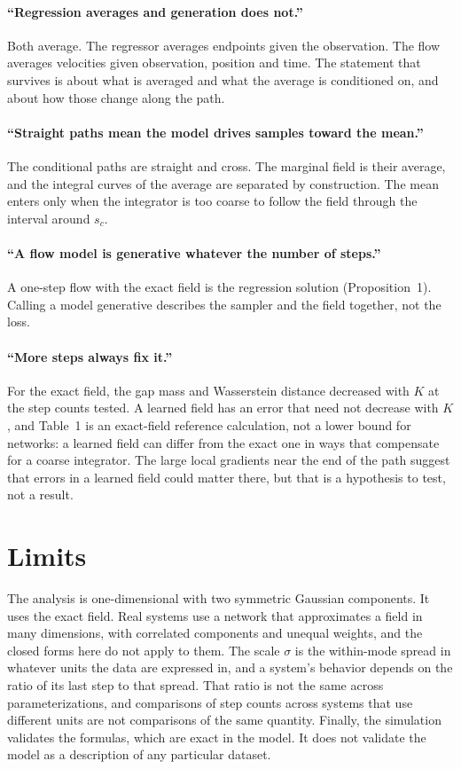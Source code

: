 \documentclass[11pt]{article}
\theoremstyle{definition}
\begin{document}
\paragraph{``Regression averages and generation does not.''} Both average. The regressor averages endpoints given the observation. The flow averages velocities given observation, position and time. The statement that survives is about what is averaged and what the average is conditioned on, and about how those change along the path.

\paragraph{``Straight paths mean the model drives samples toward the mean.''} The conditional paths are straight and cross. The marginal field is their average, and the integral curves of the average are separated by construction. The mean enters only when the integrator is too coarse to follow the field through the interval around $s_c$.

\paragraph{``A flow model is generative whatever the number of steps.''} A one-step flow with the exact field is the regression solution (Proposition~1). Calling a model generative describes the sampler and the field together, not the loss.

\paragraph{``More steps always fix it.''} For the exact field, the gap mass and Wasserstein distance decreased with $K$ at the step counts tested. A learned field has an error that need not decrease with $K$, and Table~1 is an exact-field reference calculation, not a lower bound for networks: a learned field can differ from the exact one in ways that compensate for a coarse integrator. The large local gradients near the end of the path suggest that errors in a learned field could matter there, but that is a hypothesis to test, not a result.

\section{Limits}

The analysis is one-dimensional with two symmetric Gaussian components. It uses the exact field. Real systems use a network that approximates a field in many dimensions, with correlated components and unequal weights, and the closed forms here do not apply to them. The scale $\sigma$ is the within-mode spread in whatever units the data are expressed in, and a system's behavior depends on the ratio of its last step to that spread. That ratio is not the same across parameterizations, and comparisons of step counts across systems that use different units are not comparisons of the same quantity. Finally, the simulation validates the formulas, which are exact in the model. It does not validate the model as a description of any particular dataset.
\end{document}
